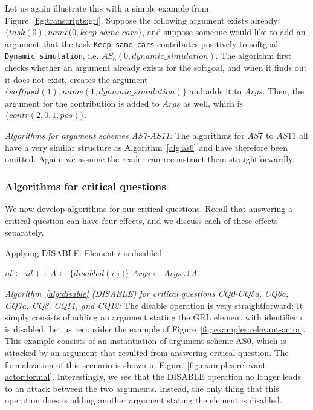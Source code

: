 Let us again illustrate this with a simple example from Figure~\ref{fig:transcripts:grl}. Suppose the following argument exists already: $\{task(0),name(0,keep\_same\_cars\}$, and suppose someone would like to add an argument that the task \texttt{Keep same cars} contributes positively to softgoal \texttt{Dynamic simulation}, i.e. $AS_6(0,dynamic\_simulation)$. The algorithm first checks whether an argument already exists for the softgoal, and when it finds out it does not exist, creates the argument $\{softgoal(1),name(1,dynamic\_simulation)\}$ and adds it to $Args$. Then, the argument for the contribution is added to $Args$ as well, which is $\{contr(2,0,1,pos)\}$.

\emph{Algorithms for argument schemes AS7-AS11:} The algorithms for $AS7$ to $AS11$ all have a very similar structure as Algorithm~\ref{alg:as6} and have therefore been omitted. Again, we assume the reader can reconstruct them straightforwardly.

\subsubsection*{Algorithms for critical questions}

We now develop algorithms for our critical questions. Recall that answering a critical question can have four effects, and we discuss each of these effects separately.

\begin{algorithm}[h]
  \caption{Applying DISABLE: Element $i$ is disabled}\label{alg:disable}
  \begin{algorithmic}[1]
    \State $id\gets id+1$
    \State $A\gets \{disabled(i))\}$
    \State $Args \gets Args\cup A$
    \EndProcedure
  \end{algorithmic}
\end{algorithm}

\emph{Algorithm~\ref{alg:disable} (\textsf{DISABLE}) for critical questions CQ0-CQ5a, CQ6a, CQ7a, CQ8, CQ11, and CQ12:} The disable operation is very straightforward: It simply consists of adding an argument stating the GRL element with identifier $i$ is disabled. Let us reconsider the example of Figure~\ref{fig:examples:relevant-actor}. This example consists of an instantiation of argument scheme AS0, which is attacked by an argument that resulted from answering critical question. The formalization of this scenario is shown in Figure~\ref{fig:examples:relevant-actor:formal}. Interestingly, we see that the \textsf{DISABLE} operation no longer leads to an attack between the two arguments. Instead, the only thing that this operation does is adding another argument stating the element is disabled.

